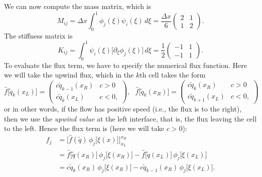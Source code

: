 \documentclass[12pt]{article}
\numberwithin{equation}{section}
\begin{document}
We can now compute the mass matrix, which is
\begin{equation}
M_{ij} = \Delta x \int_0^1 \phi_j(\xi) \psi_i(\xi) \, d\xi = \frac{\Delta x}{6}
\begin{pmatrix}
2 & 1 \\
1 & 2
\end{pmatrix}.
\end{equation}
The stiffness matrix is
\begin{equation}
K_{ij} = \int_0^1 \psi_i(\xi) \big[ \partial_\xi \phi_j(\xi) \big] \, d\xi = \frac{1}{2}
\begin{pmatrix}
-1 & 1 \\
-1 & 1
\end{pmatrix}.
\end{equation}
To evaluate the flux term, we have to specify the numerical flux function.
Here we will take the upwind flux, which in the $k$th cell takes the form
\begin{equation}
\hat{f}\big[ \tilde{q}_{k}(x_L) \big] =
\begin{pmatrix}
c \tilde{q}_{k-1}(x_R) & c > 0 \\
c \tilde{q}_{k}(x_L)   & c < 0,
\end{pmatrix}, ~~~
\hat{f}\big[ \tilde{q}_{k}(x_R) \big] =
\begin{pmatrix}
c \tilde{q}_{k}(x_R) & c > 0 \\
c \tilde{q}_{k+1}(x_L)   & c < 0,
\end{pmatrix}
\end{equation}
or in other words, if the flow has positive speed (i.e., the flux is to the right), then we use the \textit{upwind value} at the left interface, that is, the flux leaving the cell to the left.
Hence the flux term is (here we will take $c > 0$):
\begin{equation}
\begin{aligned}
f_j &= \Big[ \hat{f}(\tilde{q}) \, \phi_j\big[ \xi(x) \big] \Big]^{x_R}_{x_L} \\
&= \hat{f}\big[ \tilde{q}(x_R) \big] \, \phi_j\big[ \xi(x_R) \big]  - \hat{f}\big[ \tilde{q}(x_L) \big] \, \phi_j\big[ \xi(x_L) \big] \\
&= c \tilde{q}_{k}(x_R) \, \phi_j\big[ \xi(x_R) \big]  - c \tilde{q}_{k-1}(x_R) \, \phi_j\big[ \xi(x_L) \big]. \\
\end{aligned}
\end{equation}
\end{document}
